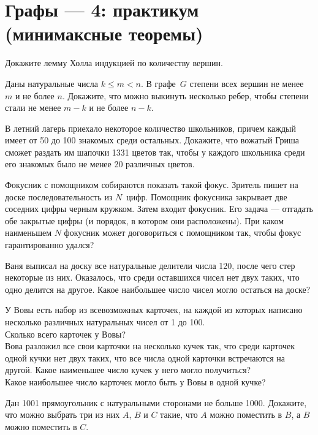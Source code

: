 

\section*{Графы --- 4: практикум (минимаксные теоремы)}


\begin{problems}

\item
Докажите лемму Холла индукцией по количеству вершин.

\item
Даны натуральные числа $k \leq m < n$.
В графе~$G$ степени всех вершин не менее $m$ и не более $n$.
Докажите, что можно выкинуть несколько ребер, чтобы степени стали не менее
$m - k$ и не более $n - k$.

\item
В летний лагерь приехало некоторое количество школьников, причем каждый имеет
от 50 до 100 знакомых среди остальных.
Докажите, что вожатый Гриша сможет раздать им шапочки 1331 цветов так, чтобы
у каждого школьника среди его знакомых было не менее 20 различных цветов.

\item
Фокусник с помощником собираются показать такой фокус.
Зритель пишет на доске последовательность из $N$~цифр.
Помощник фокусника закрывает две соседних цифры черным кружком.
Затем входит фокусник.
Его задача --- отгадать обе закрытые цифры (и порядок, в котором они
расположены).
При каком наименьшем $N$ фокусник может договориться с помощником так, чтобы
фокус гарантированно удался?

\item
Ваня выписал на доску все натуральные делители числа 120, после чего стер
некоторые из них.
Оказалось, что среди оставшихся чисел нет двух таких, что одно делится
на другое.
Какое наибольшее число чисел могло остаться на доске?

\item
У Вовы есть набор из всевозможных карточек, на каждой из которых написано
несколько различных натуральных чисел от 1 до 100.
\\
\sp
Сколько всего карточек у Вовы?
\\
\sp
Вова разложил все свои карточки на несколько кучек так, что среди карточек
одной кучки нет двух таких, что все числа одной карточки встречаются на другой.
Какое наименьшее число кучек у него могло получиться?
\\
\sp
Какое наибольшее число карточек могло быть у Вовы в одной кучке?

\item
Дан 1001 прямоугольник с натуральными сторонами не больше 1000.
Докажите, что можно выбрать три из них $A$, $B$ и $C$ такие, что $A$ можно
поместить в $B$, а $B$ можно поместить в $C$.

\end{problems}

